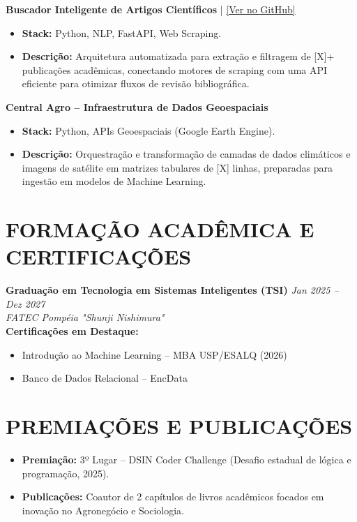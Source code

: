 \documentclass[11pt,a4paper]{article}
\begin{document}
\textbf{Buscador Inteligente de Artigos Científicos} | \href{https://github.com/marciomazega}{[Ver no GitHub]}
\begin{itemize}
    \item \textbf{Stack:} Python, NLP, FastAPI, Web Scraping.
    \item \textbf{Descrição:} Arquitetura automatizada para extração e filtragem de [X]+ publicações acadêmicas, conectando motores de scraping com uma API eficiente para otimizar fluxos de revisão bibliográfica.
\end{itemize}

\textbf{Central Agro -- Infraestrutura de Dados Geoespaciais}
\begin{itemize}
    \item \textbf{Stack:} Python, APIs Geoespaciais (Google Earth Engine).
    \item \textbf{Descrição:} Orquestração e transformação de camadas de dados climáticos e imagens de satélite em matrizes tabulares de [X] linhas, preparadas para ingestão em modelos de Machine Learning.
\end{itemize}

\vspace{0.2cm}
\section*{FORMAÇÃO ACADÊMICA E CERTIFICAÇÕES}
\textbf{Graduação em Tecnologia em Sistemas Inteligentes (TSI)} \hfill \textit{Jan 2025 -- Dez 2027} \\
\textit{FATEC Pompéia "Shunji Nishimura"} \\
\vspace{0.1cm}
\textbf{Certificações em Destaque:}
\begin{itemize}
    \item Introdução ao Machine Learning -- MBA USP/ESALQ (2026)
    \item Banco de Dados Relacional -- EncData
\end{itemize}

\vspace{0.2cm}
\section*{PREMIAÇÕES E PUBLICAÇÕES}
\begin{itemize}
    \item \textbf{Premiação:} 3º Lugar -- DSIN Coder Challenge (Desafio estadual de lógica e programação, 2025).
    \item \textbf{Publicações:} Coautor de 2 capítulos de livros acadêmicos focados em inovação no Agronegócio e Sociologia.
\end{itemize}
\end{document}
